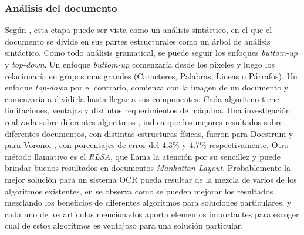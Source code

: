 \documentclass[a4paper, 11pt, oneside]{article}
\begin{document}
	\subsubsection{Análisis del documento}
	Según \cite{doc_analysis2}, esta etapa puede ser vista como un análisis sintáctico,
	en el que el documento se divide en sus partes estructurales como un árbol de análisis
	sintáctico. Como todo análisis gramatical, se puede seguir los enfoques
	\textit{buttom-up} y \textit{top-down}. Un enfoque \textit{buttom-up} comenzaría desde
	los píxeles y luego los relacionaría en grupos mas grandes (Caracteres, Palabras, Lineas
	o Párrafos). Un enfoque \textit{top-down} por el contrario, comienza con la imagen de un
	documento y comenzaría a dividirla hasta llegar a sus componentes.
	Cada algoritmo tiene limitaciones, ventajas y distintos requerimientos de máquina.
	Una investigación realizada sobre diferentes algoritmos \cite{benchmark1}, indica que los
	mejores resultados sobre diferentes documentos, con distintas estructuras físicas,
	fueron para Docstrum \cite{docstrum93} y para Voronoi \cite{voronoi1}, con porcentajes
	de error del 4.3\% y 4.7\% respectivamente. Otro método
	llamativo es el \textit{RLSA}, que llama la atención por su sencillez y puede brindar
	buenos resultados en documentos \textit{Manhattan-Layout}\cite{RLSA1}.
	Probablemente la mejor solución para un sistema OCR pueda resultar de la mezcla de
	varios de los algoritmos existentes, en \cite{voronoi2} se observa como se pueden mejorar
	los resultados mezclando los beneficios de diferentes algoritmos para soluciones
	particulares, y cada uno de los artículos mencionados aporta elementos importantes para
        escoger cual de estos algoritmos es ventajoso para una solución particular.
	
\end{document}
